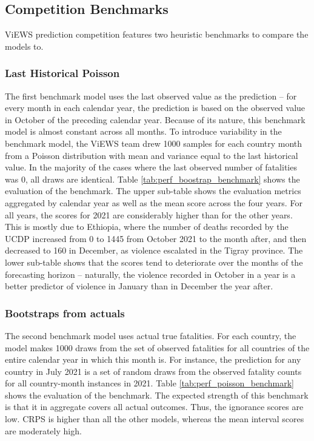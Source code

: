 \documentclass[runningheads]{llncs}
\begin{document}

    \subsection{Competition Benchmarks}
    ViEWS prediction competition features two heuristic benchmarks to compare the models to.

    \subsubsection{Last Historical Poisson}

    The first benchmark model uses the last observed value as the prediction – for every month in each calendar year, the prediction is based on the observed value in October of the preceding calendar year. Because of its nature, this benchmark model is almost constant across all months. To introduce variability in the benchmark model, the ViEWS team drew 1000 samples for each country month from a Poisson distribution with mean and variance equal to the last historical value. In the majority of the cases where the last observed number of fatalities was 0, all draws are identical. Table \ref{tab:perf_boostrap_benchmark} shows the evaluation of the benchmark. The upper sub-table shows the evaluation metrics aggregated by calendar year as well as the mean score across the four years. For all years, the scores for 2021 are considerably higher than for the other years. This is mostly due to Ethiopia, where the number of deaths recorded by the UCDP increased from 0 to 1445 from October 2021 to the month after, and then decreased to 160 in December, as violence escalated in the Tigray province. The lower sub-table shows that the scores tend to deteriorate over the months of the forecasting horizon – naturally, the violence recorded in October in a year is a better predictor of violence in January than in December the year after.

    \subsubsection{Bootstraps from actuals}

    The second benchmark model uses actual true fatalities. For each country, the model makes 1000 draws from the set of observed fatalities for all countries of the entire calendar year in which this month is. For instance, the prediction for any country in July 2021 is a set of random draws from the observed fatality counts for all country-month instances in 2021. Table \ref{tab:perf_poisson_benchmark} shows the evaluation of the benchmark. The expected strength of this benchmark is that it in aggregate covers all actual outcomes. Thus, the ignorance scores are low. CRPS is higher than all the other models, whereas the mean interval scores are moderately high.
\end{document}

